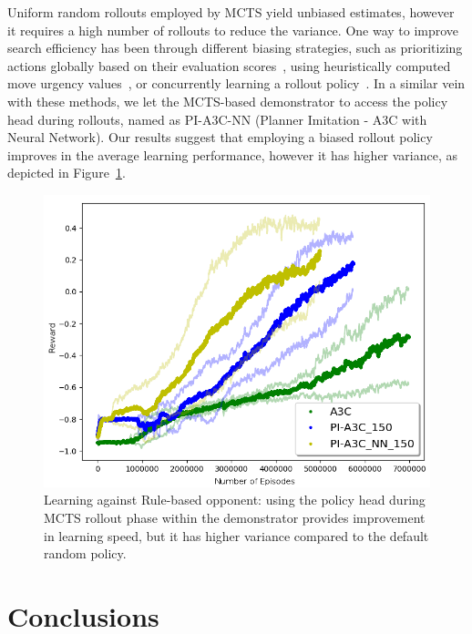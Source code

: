 \documentclass[letterpaper]{article} %
\begin{document}
Uniform random rollouts employed by MCTS yield unbiased estimates, however it requires a high number of rollouts to reduce the variance. One way to improve search efficiency has been through different biasing strategies, such as prioritizing actions globally based on their evaluation scores~\cite{kartal2014user},
using heuristically computed move urgency values~\cite{bouzy2005associating}, or concurrently learning a rollout policy~\cite{ilhan2017monte}. In a similar vein with these methods, we let the MCTS-based demonstrator to access the policy head during rollouts, named as PI-A3C-NN (Planner Imitation - A3C with Neural Network). Our results suggest that employing a biased rollout policy improves in the average learning performance, however it has higher variance, as depicted in Figure~\ref{fig:simple_rollout_biasing}.

\begin{figure}
\centering
\includegraphics[scale=0.305]{simple_mc_vs_ags_150.png}
\caption{Learning against Rule-based opponent: using the policy head during MCTS rollout phase within the demonstrator provides improvement in learning speed, but it has higher variance compared to the default random policy.}
\label{fig:simple_rollout_biasing}
\end{figure}

\section{Conclusions}
\end{document}
